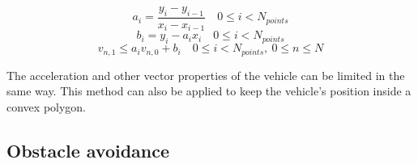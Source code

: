\begin{equation}
\label{eq:lin-a}
a_i = \dfrac{y_{i} - y_{i-1}}{x_{i} - x_{i-1}} \quad 0 \leq i < N_{points}
\end{equation}
\begin{equation}
\label{eq:lin-b}
b_i = y_{i} - a_i x_i  \quad 0 \leq i < N_{points}
\end{equation}
\begin{equation}
\label{eq:vmax}
v_{n, 1} \leq a_i v_{n,0} + b_i  \quad 0 \leq i < N_{points}, ~ 0 \leq n \leq N
\end{equation}


The acceleration and other vector properties of the vehicle can be limited in the same way. This method can also be applied to keep the vehicle's position inside a convex polygon.
\subsection{Obstacle avoidance}


